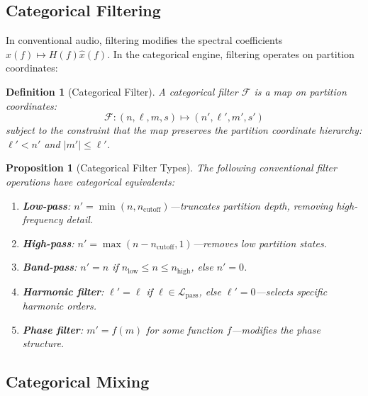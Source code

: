 \documentclass[twocolumn,10pt]{article}
\newtheorem{proposition}[theorem]{Proposition}
\newtheorem{definition}[theorem]{Definition}
\theoremstyle{remark}
\newcommand{\calF}{\mathcal{F}}
\newcommand{\calL}{\mathcal{L}}
\begin{document}
\subsection{Categorical Filtering}

In conventional audio, filtering modifies the spectral coefficients $\hat{x}(f) \mapsto H(f) \hat{x}(f)$. In the categorical engine, filtering operates on partition coordinates:

\begin{definition}[Categorical Filter]
\label{def:categorical_filter}
A categorical filter $\calF$ is a map on partition coordinates:
\begin{equation}
    \calF: (n, \ell, m, s) \mapsto (n', \ell', m', s')
    \label{eq:categorical_filter}
\end{equation}
subject to the constraint that the map preserves the partition coordinate hierarchy: $\ell' < n'$ and $|m'| \leq \ell'$.
\end{definition}

\begin{proposition}[Categorical Filter Types]
\label{prop:filter_types}
The following conventional filter operations have categorical equivalents:
\begin{enumerate}
    \item \textbf{Low-pass}: $n' = \min(n, n_{\mathrm{cutoff}})$---truncates partition depth, removing high-frequency detail.
    \item \textbf{High-pass}: $n' = \max(n - n_{\mathrm{cutoff}}, 1)$---removes low partition states.
    \item \textbf{Band-pass}: $n' = n$ if $n_{\mathrm{low}} \leq n \leq n_{\mathrm{high}}$, else $n' = 0$.
    \item \textbf{Harmonic filter}: $\ell' = \ell$ if $\ell \in \calL_{\mathrm{pass}}$, else $\ell' = 0$---selects specific harmonic orders.
    \item \textbf{Phase filter}: $m' = f(m)$ for some function $f$---modifies the phase structure.
\end{enumerate}
\end{proposition}

\subsection{Categorical Mixing}
\end{document}
